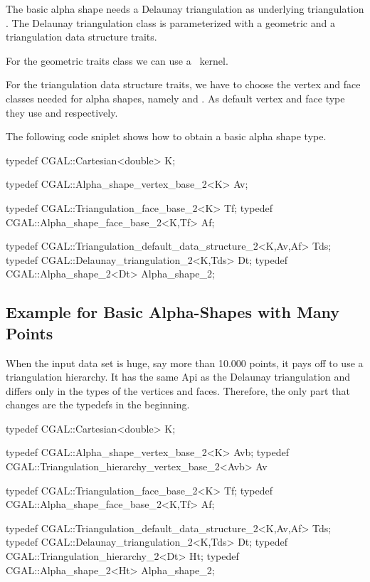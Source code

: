 The basic alpha shape needs a Delaunay triangulation as
underlying triangulation .  The Delaunay triangulation class is
parameterized with a geometric and a triangulation data structure traits.

For the geometric traits class we can use a \cgal\ kernel.

For the triangulation data structure traits, we have to
choose the vertex and face classes needed for alpha shapes,
namely  and .
As default vertex and face type they use 
and   respectively. 



The following code sniplet shows how to obtain a basic
alpha shape type.

\begin{cprog}
typedef CGAL::Cartesian<double> K;

typedef CGAL::Alpha_shape_vertex_base_2<K> Av;

typedef CGAL::Triangulation_face_base_2<K> Tf;
typedef CGAL::Alpha_shape_face_base_2<K,Tf> Af;

typedef CGAL::Triangulation_default_data_structure_2<K,Av,Af> Tds;
typedef CGAL::Delaunay_triangulation_2<K,Tds> Dt;
typedef CGAL::Alpha_shape_2<Dt> Alpha_shape_2;
\end{cprog}


\subsection{Example for Basic Alpha-Shapes with Many Points
         \label{I1_SectClassicAS2DHier}}

When the input data set is huge, say more than 10.000 points, it pays
off to use a triangulation hierarchy. It has the same {\sc Api} as the
Delaunay triangulation and differs only in the types of the vertices
and faces. Therefore, the only part that changes are the typedefs in the beginning.

\begin{cprog}
typedef CGAL::Cartesian<double> K;

typedef CGAL::Alpha_shape_vertex_base_2<K> Avb;
typedef CGAL::Triangulation_hierarchy_vertex_base_2<Avb> Av 

typedef CGAL::Triangulation_face_base_2<K> Tf;
typedef CGAL::Alpha_shape_face_base_2<K,Tf> Af;

typedef CGAL::Triangulation_default_data_structure_2<K,Av,Af> Tds;
typedef CGAL::Delaunay_triangulation_2<K,Tds> Dt;
typedef CGAL::Triangulation_hierarchy_2<Dt> Ht;
typedef CGAL::Alpha_shape_2<Ht> Alpha_shape_2;
\end{cprog}


